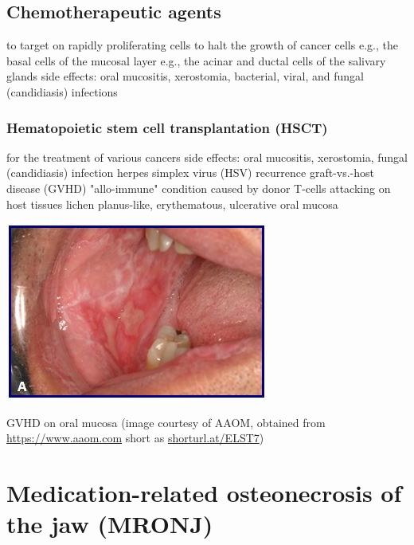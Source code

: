 \documentclass[
paper=landscape,
paper=160mm:90mm, %
fontsize=11pt, %
pagesize, %
parskip=half-, %
]{scrartcl} %
\theoremstyle{mythmstyle} %
\begin{document}
\subsection{Chemotherapeutic agents}

\begin{outline}
    \1 to target on rapidly proliferating cells
        \2 to halt the growth of cancer cells
        \2 e.g., the basal cells of the mucosal layer
        \2 e.g., the acinar and ductal cells of the salivary glands
    \1 side effects: oral mucositis, xerostomia, bacterial, viral, and fungal (candidiasis) infections
\end{outline}

\clearpage

\subsubsection{Hematopoietic stem cell transplantation (HSCT)}
\begin{outline}
    \1 for the treatment of various cancers
    \1 side effects:
        \2 oral mucositis, xerostomia, fungal (candidiasis) infection
        \2 herpes simplex virus (HSV) recurrence
        \2 graft-vs.-host disease (GVHD)
            \3 "allo-immune" condition caused by donor T-cells attacking on host tissues
            \3 lichen planus-like,  erythematous, ulcerative oral mucosa
\end{outline}

\includegraphics[width=0.5\linewidth]{oral chronic gvhd 1.jpg}

GVHD on oral mucosa (image courtesy of AAOM, obtained from \url{https://www.aaom.com} short as \url{shorturl.at/ELST7})

\clearpage

\section{Medication-related osteonecrosis of the jaw (MRONJ)}
\end{document}
